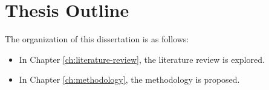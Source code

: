 \section{Thesis Outline}

The organization of this dissertation is as follows:
\begin{itemize}
	\item In Chapter \ref{ch:literature-review}, the literature review is explored.
	\item In Chapter \ref{ch:methodology}, the methodology is proposed.
\end{itemize}


\FloatBarrier
